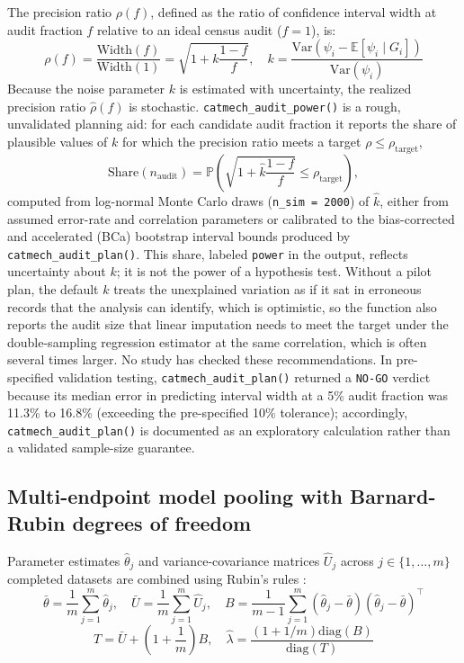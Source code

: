 \documentclass[
]{article}
\begin{document}
The precision ratio \(\rho(f)\), defined as the ratio of confidence
interval width at audit fraction \(f\) relative to an ideal census audit
(\(f = 1\)), is:
\[\rho(f) = \frac{\text{Width}(f)}{\text{Width}(1)} = \sqrt{1 + k \frac{1 - f}{f}}, \quad k = \frac{\text{Var}(\psi_i - \mathbb{E}[\psi_i \mid G_i])}{\text{Var}(\psi_i)}\]
Because the noise parameter \(k\) is estimated with uncertainty, the
realized precision ratio \(\hat{\rho}(f)\) is stochastic.
\texttt{catmech\_audit\_power()} is a rough, unvalidated planning aid:
for each candidate audit fraction it reports the share of plausible
values of \(k\) for which the precision ratio meets a target
\(\rho \le \rho_{\text{target}}\),
\[\text{Share}(n_{\text{audit}}) = \mathbb{P}\left(\sqrt{1 + \hat{k} \frac{1 - f}{f}} \le \rho_{\text{target}}\right),\]
computed from log-normal Monte Carlo draws (\texttt{n\_sim\ =\ 2000}) of
\(\hat{k}\), either from assumed error-rate and correlation parameters
or calibrated to the bias-corrected and accelerated (BCa) bootstrap
interval bounds produced by \texttt{catmech\_audit\_plan()}. This share,
labeled \texttt{power} in the output, reflects uncertainty about \(k\);
it is not the power of a hypothesis test. Without a pilot plan, the
default \(k\) treats the unexplained variation as if it sat in erroneous
records that the analysis can identify, which is optimistic, so the
function also reports the audit size that linear imputation needs to
meet the target under the double-sampling regression estimator
\citep{cochran1977sampling} at the same correlation, which is often
several times larger. No study has checked these recommendations. In
pre-specified validation testing, \texttt{catmech\_audit\_plan()}
returned a \texttt{NO-GO} verdict because its median error in predicting
interval width at a 5\% audit fraction was 11.3\% to 16.8\% (exceeding
the pre-specified 10\% tolerance); accordingly,
\texttt{catmech\_audit\_plan()} is documented as an exploratory
calculation rather than a validated sample-size guarantee.

\subsection{Multi-endpoint model pooling with Barnard-Rubin degrees of
freedom}\label{multi-endpoint-model-pooling-with-barnard-rubin-degrees-of-freedom}

Parameter estimates \(\hat{\theta}_j\) and variance-covariance matrices
\(\hat{U}_j\) across \(j \in \{1, \dots, m\}\) completed datasets are
combined using Rubin's rules \citep{rubin1987multiple}:
\[\bar{\theta} = \frac{1}{m} \sum_{j=1}^m \hat{\theta}_j, \quad \bar{U} = \frac{1}{m} \sum_{j=1}^m \hat{U}_j, \quad B = \frac{1}{m - 1} \sum_{j=1}^m (\hat{\theta}_j - \bar{\theta})(\hat{\theta}_j - \bar{\theta})^\top\]
\[T = \bar{U} + \left(1 + \frac{1}{m}\right) B, \quad \hat{\lambda} = \frac{(1 + 1/m) \text{diag}(B)}{\text{diag}(T)}\]
\end{document}
